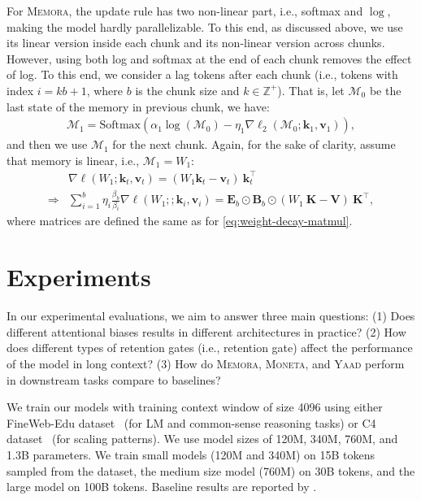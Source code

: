 \documentclass{article}
\newcommand{\citep}{\parencite}
\newcommand{\citet}{\textcite}
\newcommand{\ymodel}[0]{\textsc{Yaad}}
\newcommand{\mmodel}[0]{\textsc{Moneta}}
\newcommand{\xmodel}[0]{\textsc{Memora}}
\newcommand{\vk}[0]{\mathbf{k}}
\newcommand{\vvv}[0]{\mathbf{v}}
\newcommand{\M}[0]{\mathcal{M}}
\theoremstyle{plain}
\theoremstyle{definition}
\theoremstyle{remark}
\newcommand{\head}[1]{\vspace{1.7mm}\noindent{{\textcolor{c2}{\bf #1.}}}}
\begin{document}
For \xmodel, the update rule has two non-linear part, i.e., softmax and $\log$, making the model hardly parallelizable. To this end, as discussed above, we use its linear version inside each chunk and its non-linear version across chunks. However, using both log and softmax at the end of each chunk removes the effect of log. To this end, we consider a lag tokens after each chunk (i.e., tokens with index $i = k b + 1$, where $b$ is the chunk size and $k \in \mathbb{Z}^{+}$). That is, let $\M_0$ be the last state of the memory in previous chunk, we have:
\begin{align}
    \M_1 = \mbox{Softmax}\left( \alpha_1 \log(\M_{0})  - \eta_1  \nabla \ell_2(\M_{0};\vk_1, \vvv_1)\right),
\end{align}
and then we use $\M_1$ for the next chunk. Again, for the sake of clarity, assume that memory is linear, i.e.,  $\M_1 = W_1$:
\begin{align}
    &\nabla \ell(W_{1};\vk_t, \vvv_t) = (W_1 \vk_t - \vvv_t)\:\vk_t^{\top} \\ \label{eq:weight-decay-matmul2}
    \Rightarrow &\sum_{i = 1}^{b} \eta_i \frac{\beta_{b}}{\beta_{i}} \nabla \ell(W_{1}; ;\vk_i, \vvv_i)  =  \mathbf{E}_b \odot \mathbf{B}_b \odot (W_1 \: \mathbf{K} - \mathbf{V}) \: \mathbf{K}^{\top}, 
\end{align}
where matrices are defined the same as for \autoref{eq:weight-decay-matmul}.

\section{Experiments} \label{sec:exp}
In our experimental evaluations, we aim to answer three main questions: (1) Does different attentional biases results in different architectures in practice? (2) How does different types of retention gates (i.e., retention gate) affect the performance of the model in long context? (3) How do \xmodel, \mmodel, and \ymodel{} perform in downstream tasks compare to baselines?

\head{Setup}
We train our models with training context window of size 4096 using either FineWeb-Edu dataset~\citep{penedo2024the} (for LM and common-sense reasoning tasks) or C4 dataset~\citep{raffel2020exploring} (for scaling patterns). We use model sizes of 120M, 340M, 760M, and 1.3B parameters. We train small models (120M and 340M) on 15B tokens sampled from the dataset, the medium size model (760M) on 30B tokens, and the large model on 100B tokens. Baseline results are reported by \citet{behrouz2024titans}.
\end{document}
